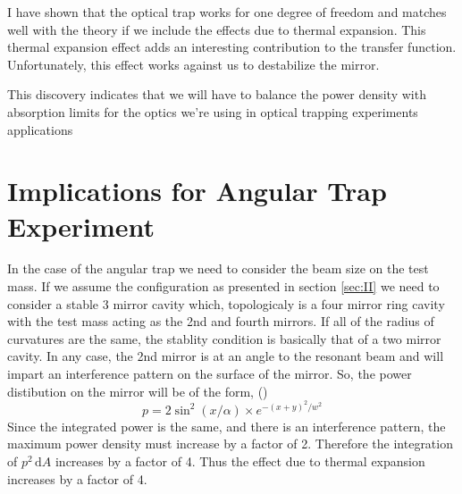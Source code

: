 \acresetall

I have shown that the optical trap works for one degree of freedom and
matches well with the theory if we include the effects due to thermal
expansion.
This thermal expansion effect adds an interesting contribution to the transfer
function. Unfortunately, this effect works against us to destabilize the mirror.

This discovery indicates that we will have to balance the power density with
absorption limits for the optics we're using in optical trapping experiments
applications

\section{Implications for Angular Trap Experiment}
In the case of the angular trap we need to consider the beam size on the
test mass.
If we assume the configuration as presented in section \ref{sec:II} we
need to consider a stable 3 mirror cavity which, topologicaly is a four
mirror ring cavity with the test mass acting as the 2nd and fourth mirrors.
If all of the radius of curvatures are the same, the stablity condition is
basically that of a two mirror cavity.
In any case, the 2nd mirror is at an angle to the resonant beam and will
impart an interference pattern on the surface of the mirror.
So, the power distibution on the mirror will be of the form,
()
\begin{equation}
p = 2 \sin^2(x/\alpha) \times e^{-(x+y)^2/w^2 }
\end{equation}
Since the integrated power is the same, and there is an interference pattern,
the maximum power density must increase by a factor of 2.
Therefore the integration of $p^2 \, \mathrm{d}A$ increases by a factor of 4.
Thus the effect due to thermal expansion increases by a factor of 4.


